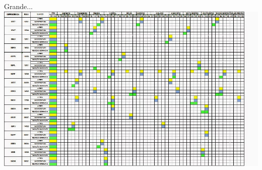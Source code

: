 \documentclass{beamer}
\begin{document}
\begin{frame}{Grande...}
  \includegraphics[width=\textwidth]{Etapas/cronograma-3}
\end{frame}





\end{document}
